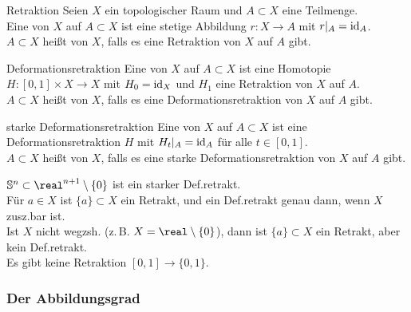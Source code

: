 \linie

\begin{Def}{Retraktion}
    Seien $X$ ein topologischer Raum und $A \subset X$ eine Teilmenge. \\
    Eine  von $X$ auf $A \subset X$ ist eine stetige
    Abbildung $r\colon X \rightarrow A$ mit $r|_A = \operatorname{id}_A$. \\
    $A \subset X$ heißt  von $X$, falls es eine Retraktion
    von $X$ auf $A$ gibt.
\end{Def}

\begin{Def}{Deformationsretraktion}
    Eine  von $X$ auf $A \subset X$
    ist eine Homotopie
    $H\colon [0, 1] \times X \rightarrow X$ mit $H_0 = \operatorname{id}_X$ und
    $H_1$ eine Retraktion von $X$ auf $A$. \\
    $A \subset X$ heißt  von $X$, falls es eine
    Deformationsretraktion von $X$ auf $A$ gibt.
\end{Def}

\begin{Def}{starke Deformationsretraktion}
    Eine  von $X$ auf $A \subset X$
    ist eine
    Deformationsretraktion $H$ mit $H_t|_A = \operatorname{id}_A$ für alle $t \in [0, 1]$. \\
    $A \subset X$ heißt  von $X$, falls es
    eine starke Deformationsretraktion von $X$ auf $A$ gibt.
\end{Def}

\begin{Bsp}
    $\sphere^n \subset \real^{n+1} \setminus \{0\}$ ist ein
    starker Def.retrakt. \\
    Für $a \in X$ ist $\{a\} \subset X$ ein Retrakt,
    und ein Def.retrakt genau dann, wenn $X$ zusz.bar ist. \\
    Ist $X$ nicht wegzsh. (z.\,B. $X = \real \setminus \{0\}$), dann ist
    $\{a\} \subset X$ ein Retrakt, aber kein Def.retrakt. \\
    Es gibt keine Retraktion $[0, 1] \rightarrow \{0, 1\}$.
\end{Bsp}

\pagebreak

\subsubsection{%
    Der Abbildungsgrad%
}

